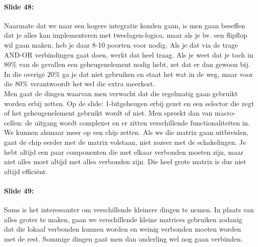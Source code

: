 \documentclass[10pt,a4paper]{book}
\begin{document}
\paragraph{Slide 48:} Naarmate dat we naar een hogere integratie konden gaan, is men gaan beseffen dat je alles kan implementeren met tweelagen-logica, maar als je bv. een flipflop wil gaan maken, heb je daar 8-10 poorten voor nodig. Als je dat via de trage AND-OR verbindingen gaat doen, werkt dat heel traag. Als je weet dat je toch in 80\% van de gevallen een geheugenelement nodig hebt, zet dat er dan gewoon bij. In die overige 20\% ga je dat niet gebruiken en staat het wat in de weg, maar voor die 80\% verantwoordt het wel die extra meerkost.\\
Men gaat de dingen waarvan men verwacht dat die regelmatig gaan gebruikt worden erbij zetten. Op de slide: 1-bitgeheugen erbij gezet en een selector die zegt of het geheugenelement gebruikt wordt of niet. Men spreekt dan van macro-cellen: de uitgang wordt complexer en er zitten verschillende functionaliteiten in. \\
We kunnen alsmaar meer op een chip zetten. Als we die matrix gaan uitbreiden, gaat de chip eerder met de matrix volstaan, niet zozeer met de schakelingen. Je hebt altijd een paar componenten die met elkaar verbonden moeten zijn, maar niet alles moet altijd met alles verbonden zijn. Die heel grote matrix is dus niet altijd effici\"ent.

\paragraph{Slide 49:} Soms is het interessanter om verschillende kleinere dingen te nemen. In plaats van alles groter te maken, gaan we verschillende kleine matrices gebruiken zodanig dat die lokaal verbonden kunnen worden en weinig verbonden moeten worden met de rest. Sommige dingen gaat men dan onderling wel nog gaan verbinden.
\end{document}
